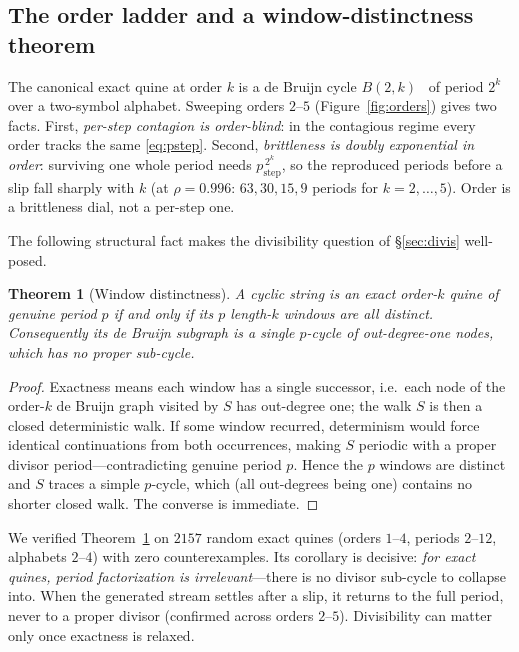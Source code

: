 \documentclass[11pt]{article}
\theoremstyle{plain}
\newtheorem{theorem}{Theorem}
\theoremstyle{definition}
\theoremstyle{remark}
\begin{document}
\subsection{The order ladder and a window-distinctness theorem}\label{sec:orders}
The canonical exact quine at order $k$ is a de Bruijn cycle $B(2,k)$~\cite{debruijn1946} of
period $2^{k}$ over a two-symbol alphabet. Sweeping orders $2$--$5$ (Figure~\ref{fig:orders}) gives two facts. First,
\emph{per-step contagion is order-blind}: in the contagious regime every order tracks the same
\eqref{eq:pstep}. Second, \emph{brittleness is doubly exponential in order}: surviving one whole
period needs $p_{\text{step}}^{\,2^{k}}$, so the reproduced periods before a slip fall sharply
with $k$ (at $\rho=0.996$: $63,30,15,9$ periods for $k=2,\dots,5$). Order is a brittleness
dial, not a per-step one.

The following structural fact makes the divisibility question of \S\ref{sec:divis} well-posed.

\begin{theorem}[Window distinctness]\label{thm:window}
A cyclic string is an exact order-$k$ quine of genuine period $p$ if and only if its $p$
length-$k$ windows are all distinct. Consequently its de Bruijn subgraph is a single $p$-cycle
of out-degree-one nodes, which has no proper sub-cycle.
\end{theorem}
\begin{proof}
Exactness means each window has a single successor, i.e.\ each node of the order-$k$ de Bruijn
graph visited by $S$ has out-degree one; the walk $S$ is then a closed deterministic walk. If
some window recurred, determinism would force identical continuations from both occurrences,
making $S$ periodic with a proper divisor period---contradicting genuine period $p$. Hence the
$p$ windows are distinct and $S$ traces a simple $p$-cycle, which (all out-degrees being one)
contains no shorter closed walk. The converse is immediate. \end{proof}

We verified Theorem~\ref{thm:window} on $2157$ random exact quines (orders $1$--$4$, periods
$2$--$12$, alphabets $2$--$4$) with zero counterexamples. Its corollary is decisive: \emph{for
exact quines, period factorization is irrelevant}---there is no divisor sub-cycle to collapse
into. When the generated stream settles after a slip, it returns to the full period, never to a
proper divisor (confirmed across orders $2$--$5$). Divisibility can matter only once exactness
is relaxed.
\end{document}
